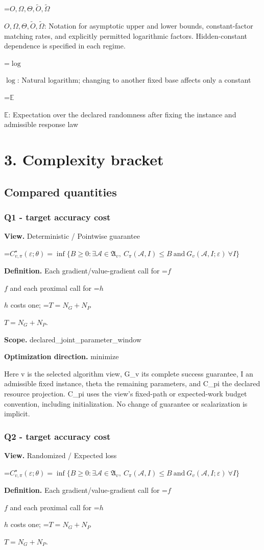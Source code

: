 \documentclass[10pt,a4paper]{article}
\newcommand{\AtlasMath}[1]{\par\begingroup\centering\setbox0=\hbox{$\displaystyle #1$}\ifdim\wd0>1.4\linewidth\typeout{ATLAS WIDE FORMULA: \the\wd0}\fi\ifdim\wd0>\linewidth\resizebox{\linewidth}{!}{\box0}\else\box0\fi\par\endgroup}
\newcommand{\AtlasInlineMath}[1]{\begingroup\setbox0=\hbox{$#1$}\ifdim\wd0>.4\linewidth\endgroup\AtlasMath{#1}\else\endgroup$#1$\fi}
\begin{document}
\AtlasInlineMath{O,\Omega,\Theta,\widetilde{O},\widetilde\Omega}: Notation for asymptotic upper and lower bounds, constant-factor matching rates, and explicitly permitted logarithmic factors. Hidden-constant dependence is specified in each regime.

\AtlasInlineMath{\log}: Natural logarithm; changing to another fixed base affects only a constant

\AtlasInlineMath{\mathbb{E}}: Expectation over the declared randomness after fixing the instance and admissible response law

\section{3. Complexity bracket}
\subsection{Compared quantities}
\subsubsection{Q1 - target accuracy cost}
\textbf{View.} Deterministic / Pointwise guarantee

\AtlasMath{C^\star_{v,\pi}(\varepsilon;\theta)=\inf\{B\ge0:\exists\mathcal A\in\mathfrak A_v,\ C_\pi(\mathcal A,I)\le B\ \text{and}\ G_v(\mathcal A,I;\varepsilon)\ \forall I\}}
\textbf{Definition.} Each gradient/value-gradient call for \AtlasInlineMath{f} and each proximal call for \AtlasInlineMath{h} costs one; \AtlasInlineMath{T=N_G+N_P}.

\textbf{Scope.} declared\_joint\_parameter\_window

\textbf{Optimization direction.} minimize

Here v is the selected algorithm view, G\_v its complete success guarantee, I an admissible fixed instance, theta the remaining parameters, and C\_pi the declared resource projection. C\_pi uses the view's fixed-path or expected-work budget convention, including initialization. No change of guarantee or scalarization is implicit.

\subsubsection{Q2 - target accuracy cost}
\textbf{View.} Randomized / Expected loss

\AtlasMath{C^\star_{v,\pi}(\varepsilon;\theta)=\inf\{B\ge0:\exists\mathcal A\in\mathfrak A_v,\ C_\pi(\mathcal A,I)\le B\ \text{and}\ G_v(\mathcal A,I;\varepsilon)\ \forall I\}}
\textbf{Definition.} Each gradient/value-gradient call for \AtlasInlineMath{f} and each proximal call for \AtlasInlineMath{h} costs one; \AtlasInlineMath{T=N_G+N_P}.
\end{document}
